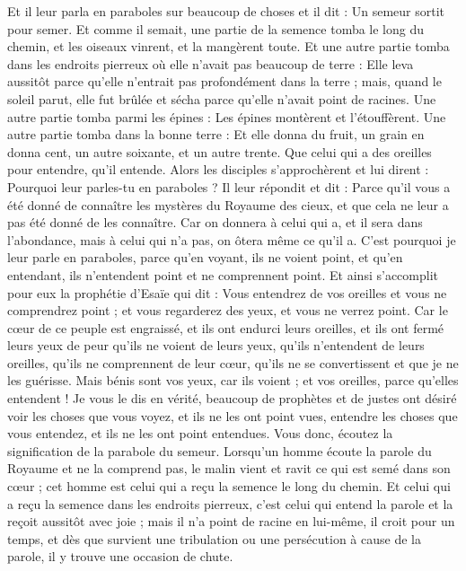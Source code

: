 \begin{multicols}{2}
Et il leur parla en paraboles sur beaucoup de choses et il dit : Un semeur sortit pour semer.
Et comme il semait, une partie de la semence tomba le long du chemin, et les oiseaux vinrent, et la mangèrent toute.
Et une autre partie tomba dans les endroits pierreux où elle n'avait pas beaucoup de terre : Elle leva aussitôt parce qu'elle n'entrait pas profondément dans la terre ;
mais, quand le soleil parut, elle fut brûlée et sécha parce qu'elle n'avait point de racines.
Une autre partie tomba parmi les épines : Les épines montèrent et l'étouffèrent.
Une autre partie tomba dans la bonne terre : Et elle donna du fruit, un grain en donna cent, un autre soixante, et un autre trente.
Que celui qui a des oreilles pour entendre, qu'il entende.
Alors les disciples s'approchèrent et lui dirent : Pourquoi leur parles-tu en paraboles ?
Il leur répondit et dit : Parce qu'il vous a été donné de connaître les mystères du Royaume des cieux, et que cela ne leur a pas été donné de les connaître.
Car on donnera à celui qui a, et il sera dans l'abondance, mais à celui qui n'a pas, on ôtera même ce qu'il a.
C'est pourquoi je leur parle en paraboles, parce qu'en voyant, ils ne voient point, et qu'en entendant, ils n'entendent point et ne comprennent point.
Et ainsi s'accomplit pour eux la prophétie d'Esaïe qui dit : Vous entendrez de vos oreilles et vous ne comprendrez point ; et vous regarderez des yeux, et vous ne verrez point.
Car le cœur de ce peuple est engraissé, et ils ont endurci leurs oreilles, et ils ont fermé leurs yeux de peur qu'ils ne voient de leurs yeux, qu'ils n'entendent de leurs oreilles, qu'ils ne comprennent de leur cœur, qu'ils ne se convertissent et que je ne les guérisse.
Mais bénis sont vos yeux, car ils voient ; et vos oreilles, parce qu'elles entendent !
Je vous le dis en vérité, beaucoup de prophètes et de justes ont désiré voir les choses que vous voyez, et ils ne les ont point vues, entendre les choses que vous entendez, et ils ne les ont point entendues.
Vous donc, écoutez la signification de la parabole du semeur.
Lorsqu'un homme écoute la parole du Royaume et ne la comprend pas, le malin vient et ravit ce qui est semé dans son cœur ; cet homme est celui qui a reçu la semence le long du chemin.
Et celui qui a reçu la semence dans les endroits pierreux, c'est celui qui entend la parole et la reçoit aussitôt avec joie ;
mais il n'a point de racine en lui-même, il croit pour un temps, et dès que survient une tribulation ou une persécution à cause de la parole, il y trouve une occasion de chute.

\end{multicols}

